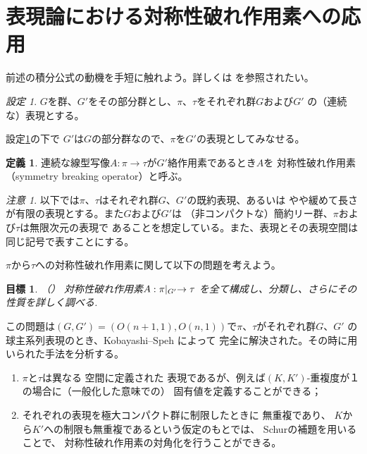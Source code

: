 \documentclass[12pt,a4paper,dvipdfmx]{jsarticle}
\numberwithin{equation}{section}
\theoremstyle{jplain}
\newtheorem*{goal*}{目標}
\theoremstyle{remark}
\newtheorem{remark}[thm]{注意}
\newtheorem{setting}[thm]{設定}
\theoremstyle{definition}
\newtheorem{definition}[thm]{定義}
\newcommand{\mykana}[2]{#1}
\begin{document}
{\section{表現論における対称性破れ作用素への応用}
前述の積分公式の動機を手短に触れよう。詳しくは\cite{kobayashi2015program,kobayashi2015symmetry}
を参照されたい。
	\begin{setting}\label{set:1}
		$G$を群、$G'$をその部分群とし、$\pi$、$\tau$をそれぞれ群$G$および$G'$
		の（連続な）表現とする。
	\end{setting}
	設定\ref{set:1}の下で
	$G'$は$G$の部分群なので、$\pi$を$G'$の表現としてみなせる。
	\begin{definition}
		連続な線型写像$A:\pi\to\tau$が$G'$絡作用素であるとき$A$を
		対称性破れ作用素（symmetry breaking operator）と呼ぶ。
	\end{definition}
	\centerline{
		\xymatrixcolsep{0.5pc}
		\xymatrixrowsep{1pc}
		}
	\begin{remark}
		以下では$\pi$、$\tau$はそれぞれ群$G$、$G'$の既約表現、あるいは
		やや{緩}めて長さが有限の表現とする。また$G$および$G'$は
		（非コンパクトな）簡約リー群、$\pi$および$\tau$は無限次元の表現で
		あることを想定している。また、表現とその表現空間は同じ記号で表すことにする。
	\end{remark}
$\pi$から$\tau$への対称性破れ作用素に関して以下の問題を考えよう。
\begin{goal*}（\cite{kobayashi2015program}）
		対称性破れ作用素${A:\pi\kern-0.1cm\mid_{G'}\to\tau}$
		を全て構成し、分類し、さらにその性質を詳しく調べる.
	\end{goal*}
	この問題は$(G,G')=(O(n+1,1),O(n,1))$で$\pi$、$\tau$がそれぞれ群$G$、$G'$
	の球主系列表現のとき、Kobayashi--Speh \cite{kobayashi2015symmetry}によって
	完全に解決された。その時に用いられた手法を分析する。
	\begin{enumerate}
		\item $\pi$と$\tau$は異なる
			空間に定義された
			表現であるが、例えば$(K,K')$-重複度が１の場合に（一般化した意味での）
			固有値を定義することができる；
		\item
それぞれの表現を極大コンパクト群に制限したときに
無重複であり、
$K$から$K'$への制限も無重複であるという仮定のもとでは、
Schurの補題を用いることで、
対称性破れ作用素の\mykana{対角化}{タイカクカ}を行うことができる。


\end{enumerate}}
\end{document}
